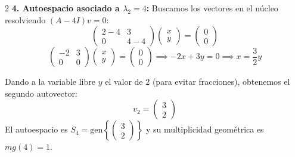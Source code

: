 \documentclass[10pt]{extarticle}
\begin{document}
\begin{multicols}{2}
\textbf{4. Autoespacio asociado a $\lambda_2 = 4$:}
Buscamos los vectores en el núcleo resolviendo $(A - 4I)v = 0$:
$$\begin{pmatrix} 2-4 & 3 \\ 0 & 4-4 \end{pmatrix} \begin{pmatrix} x \\ y \end{pmatrix} = \begin{pmatrix} 0 \\ 0 \end{pmatrix}$$
$$\begin{pmatrix} -2 & 3 \\ 0 & 0 \end{pmatrix} \begin{pmatrix} x \\ y \end{pmatrix} = \begin{pmatrix} 0 \\ 0 \end{pmatrix} \implies -2x + 3y = 0 \implies x = \frac{3}{2}y$$

Dando a la variable libre $y$ el valor de $2$ (para evitar fracciones), obtenemos el segundo autovector:
$$v_2 = \begin{pmatrix} 3 \\ 2 \end{pmatrix}$$
El autoespacio es $S_{4} = \text{gen}\left\{\begin{pmatrix} 3 \\ 2 \end{pmatrix}\right\}$ y su multiplicidad geométrica es $mg(4) = 1$.

\end{multicols}
\end{document}
